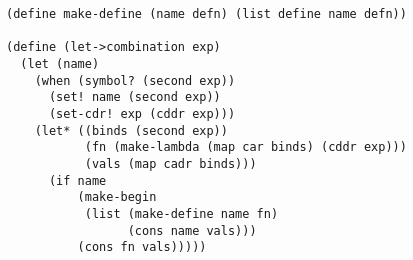 \documentclass[a4paper,12pt]{article}
\begin{document}
\begin{lstlisting}
(define make-define (name defn) (list define name defn))

(define (let->combination exp)
  (let (name)
    (when (symbol? (second exp))
      (set! name (second exp))
      (set-cdr! exp (cddr exp)))
    (let* ((binds (second exp))
           (fn (make-lambda (map car binds) (cddr exp)))
           (vals (map cadr binds)))
      (if name
          (make-begin
           (list (make-define name fn)
                 (cons name vals)))
          (cons fn vals)))))
\end{lstlisting}
\end{document}
